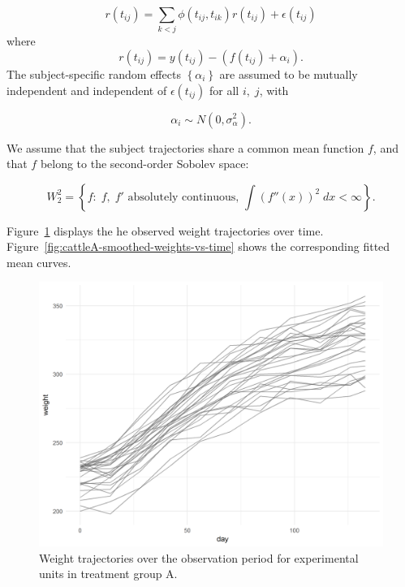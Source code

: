 \documentclass[12pt]{article}
\theoremstyle{definition}
\begin{document}
\begin{equation} \label{eq:cattleA-dynamic-cond-mixed-model-1}
r\left(t_{ij}\right) = \sum_{k < j} \phi\left( t_{ij}, t_{ik} \right) r\left(t_{ij}\right) + \epsilon\left(t_{ij}\right)
\end{equation}
\noindent
where
\begin{equation} \label{eq:cattleA-dynamic-cond-mixed-model-2}
r\left(t_{ij}\right) = y\left(t_{ij}\right) - \left(f\left(t_{ij} \right) + \alpha_{i}\right).
\end{equation}
\noindent
The subject-specific random effects $\left\{ \alpha_i \right\}$ are assumed to be mutually independent and independent of $ \epsilon\left(t_{ij}\right)$ for all $i,\;j$, with

\[
\alpha_i \sim N\left( 0, \sigma_\alpha^2 \right).
\]

We assume that the subject trajectories share a common mean function $f$, and that $f$ belong to the second-order Sobolev space:

\[
W^2_2 = \left\{f: \; f,\;f' \mbox{ absolutely continuous, } \int\left(f''\left(x\right)\right)^2 \;dx < \infty  \right\}.
\]
\noindent

Figure~\ref{fig:cattleA-weights-vs-time} displays the he observed weight trajectories over time. Figure~\ref{fig:cattleA-smoothed-weights-vs-time} shows the corresponding fitted mean curves.

\begin{figure}[H] \label{fig:cattleA-weights-vs-time}
\begin{center}
    \includegraphics[width=\textwidth]{img/cattle/cattleA-weights-vs-time}
\end{center}
 \caption{Weight trajectories over the observation period for experimental units in treatment group A.}
 \end{figure}
\end{document}
